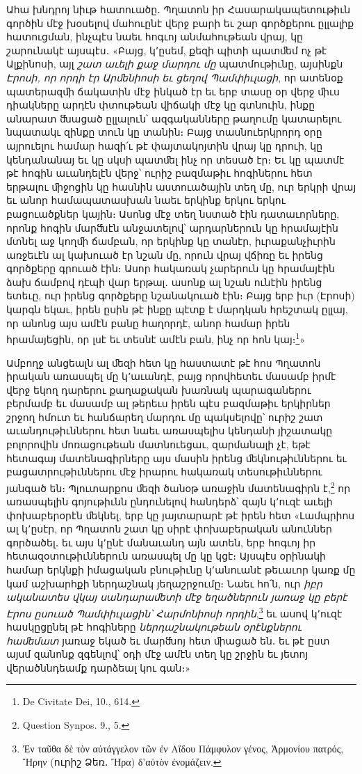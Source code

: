 \documentclass{article}
\begin{document}
{Ահա խնդրոյ նիւթ հատուածը․ Պղատոն իր Հասարակապետութիւն գործին մէջ խօսելով մահուընէ վերջ բարի եւ շար գործքերու ըլլալիք հատուցման, ինչպէս նաեւ հոգւոյ անմահութեան վրայ, կը շարունակէ այսպէս․ «Բայց, կ՚ըսեմ, քեզի պիտի պատﬔմ ոչ թէ Ալքինոսի, այլ \emph{շատ աւելի քաջ մարդու մը} պատմութիւնը, այսինքն \emph{Էրոսի, որ որդի էր Արﬔնիոսի եւ ցեղով Պամփիւլացի}, որ ատենօք պատերազﬕ ճակատին մէջ ինկած էր եւ երբ տասը օր վերջ ﬕւս դիակները արդէն փտութեան վիճակի մէջ կը գտնուին, ինքը անարատ ﬓացած ըլլալուն՝ ազգականները թաղումը կատարելու նպատակւ զինքը տուն կը տանին։ Բայց տասնուերկրորդ օրը այրուելու համար հազի՛ւ թէ փայտակոյտին վրայ կը դրուի, կը կենդանանայ եւ կը սկսի պատﬔլ ինչ որ տեսած էր։ Եւ կը պատմէ թէ հոգին աւանդելէն վերջ՝ ուրիշ բազմաթիւ հոգիներու հետ երթալու ﬕջոցին կը հասնին աստուածային տեղ մը, ուր երկրի վրայ եւ անոր համապատասխան նաեւ երկինք երկու երկու բացուածքներ կային։ Ասոնց մէջ տեղ նստած էին դատաւորները, որոնք հոգին մարﬓէն անջատելով՝ արդարներուն կը հրամայէին մտնել աջ կողﬕ ճամբան, որ երկինք կը տանէր, իւրաքանչիւրին առջեւէն ալ կախուած էր նշան մը, որուն վրայ վճիռը եւ իրենց գործքերը գրուած էին։ Ասոր հակառակ չարերուն կը հրամայէին ձախ ճամբով դէպի վար երթալ․ ասոնք ալ նշան ունէին իրենց ետեւը, ուր իրենց գործքերը նշանակուած էին։ Բայց երբ իւր (Էրոսի) կարգն եկաւ, իրեն ըսին թէ ինքը պէտք է մարդկան հրեշտակ ըլլայ, որ անոնց այս ամէն բանը հաղորդէ, անոր համար իրեն հրամայեցին, որ լսէ եւ տեսնէ ամէն բան, ինչ որ հոն կայ։\footnote{De Civitate Dei, 10., 614.}»

Ամբողջ անցեալն ալ ﬔզի հետ կը հաստատէ թէ հոս Պղատոն իրական առասպել մը կ՚աւանդէ, բայց որովհետեւ մասամբ իրմէ վերջ եկող դարերու քաղաքական խառնակ պարագաներու բերմամբ եւ մասամբ ալ թերեւս իրեն պէս բազմաթիւ երկիրներ շրջող հմուտ եւ հանճարեղ մարդու մը պակսելովը՝ ուրիշ շատ աւանդութիւններու հետ նաեւ առասպելիս կենդանի յիշատակը բոլորովին մոռացութեան մատնուեցաւ, զարմանալի չէ, եթէ հետագայ մատենագիրները այս մասին իրենց ﬔկնութիւններու եւ բացատրութիւններու մէջ իրարու հակառակ տեսութիւններու յանգած են։ Պլուտարքոս ﬔզի ծանօթ առաջին մատենագիրն է,\footnote{Question Synpos. 9., 5.} որ առասպելին գոյութիւնն ընդունելով հանդերձ՝ զայն կ՚ուզէ աւելի փոխաբերօրէն ﬔկնել, երբ կը յայտարարէ թէ իրեն հետ «Լամպրիոս ալ կ՚ըսէր, որ Պղատոն շատ կը սիրէ փոխաբերական անուններ գործածել․ եւ այս կ՚ընէ մանաւանդ այն ատեն, երբ հոգւոյ իր հետազօտութիւններուն առասպել մը կը կցէ։ Այսպէս օրինակի համար երկնքի իմացական բնութիւնը կ՚անուանէ թեւաւոր կառք մը կամ աշխարհքի ներդաշնակ յեղաշրջումը։ Նաեւ հո՛ն, ուր \emph{իբր ականատես վկայ սանդարաﬔտի մէջ եղածներուն յառաջ կը բերէ Էրոս ըսուած Պամփիւլացին՝ Հարմոնիոսի որդին},\footnote{Ἐν ταῦθα δὲ τὸν αὐτάγγελον τῶν ἐν Αἵδου Πάμφυλον γένος, Ἁρμονίου πατρός, Ἤρην (ուրիշ Ձեռ․ Ἤρα) δ’αὐτὸν ἐνομάζειν.} եւ ասով կ՚ուզէ հասկըցընել թէ հոգիները \emph{ներդաշնակութեան օրէնքներու հաﬔմատ} յառաջ եկած եւ մարﬓոյ հետ ﬕացած են․ եւ թէ ըստ այսմ զանոնք զգենլով՝ օդի մէջ ամէն տեղ կը շրջին եւ յետոյ վերածննդեամք դարձեալ կու գան։»

}
\end{document}
